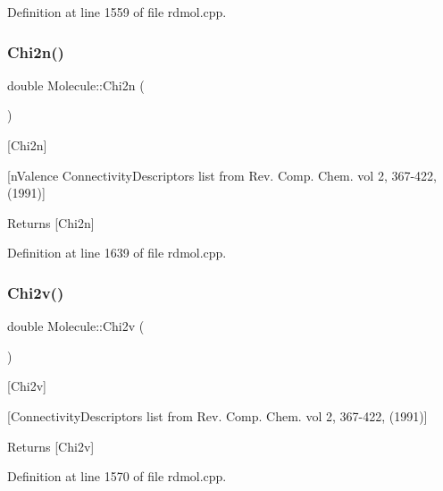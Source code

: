 Definition at line 1559 of file rdmol.\+cpp.

\mbox{\label{class_molecule_a74a0866a08a22793a822d7411e2f3758}} 
\subsubsection{\texorpdfstring{Chi2n()}{Chi2n()}}
{\footnotesize\ttfamily double Molecule\+::\+Chi2n (\begin{DoxyParamCaption}{ }\end{DoxyParamCaption})}



\mbox{[}Chi2n\mbox{]} 

\mbox{[}n\+Valence Connectivity\+Descriptors list from Rev. Comp. Chem. vol 2, 367-\/422, (1991)\mbox{]}

\begin{DoxyReturn}{Returns}
\mbox{[}Chi2n\mbox{]} 
\end{DoxyReturn}


Definition at line 1639 of file rdmol.\+cpp.

\mbox{\label{class_molecule_a31a72034aa6769237eb794d923788584}} 
\subsubsection{\texorpdfstring{Chi2v()}{Chi2v()}}
{\footnotesize\ttfamily double Molecule\+::\+Chi2v (\begin{DoxyParamCaption}{ }\end{DoxyParamCaption})}



\mbox{[}Chi2v\mbox{]} 

\mbox{[}Connectivity\+Descriptors list from Rev. Comp. Chem. vol 2, 367-\/422, (1991)\mbox{]}

\begin{DoxyReturn}{Returns}
\mbox{[}Chi2v\mbox{]} 
\end{DoxyReturn}


Definition at line 1570 of file rdmol.\+cpp.

\mbox{\label{class_molecule_ad4e37c52bc0660deeee68e487992e476}} 
